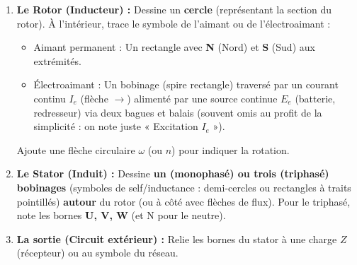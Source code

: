 \documentclass[11pt]{article}
\begin{document}
\begin{methode}
\begin{enumerate}
    \item \textbf{Le Rotor (Inducteur) :} Dessine un \textbf{cercle} (représentant la section du rotor). À l'intérieur, trace le symbole de l'aimant ou de l'électroaimant :
    \begin{itemize}
        \item Aimant permanent : Un rectangle avec \textbf{N} (Nord) et \textbf{S} (Sud) aux extrémités.
        \item Électroaimant : Un bobinage (spire rectangle) traversé par un courant continu $I_e$ (flèche $\rightarrow$) alimenté par une source continue $E_e$ (batterie, redresseur) via deux bagues et balais (souvent omis au profit de la simplicité : on note juste « Excitation $I_e$ »).
    \end{itemize}
    Ajoute une flèche circulaire $\omega$ (ou $n$) pour indiquer la rotation.
    \item \textbf{Le Stator (Induit) :} Dessine \textbf{un (monophasé) ou trois (triphasé) bobinages} (symboles de self/inductance : demi-cercles ou rectangles à traits pointillés) \textbf{autour} du rotor (ou à côté avec flèches de flux). Pour le triphasé, note les bornes \textbf{U, V, W} (et N pour le neutre).
    \item \textbf{La sortie (Circuit extérieur) :} Relie les bornes du stator à une charge $Z$ (récepteur) ou au symbole du réseau.
\end{enumerate}
\end{methode}
\end{document}
